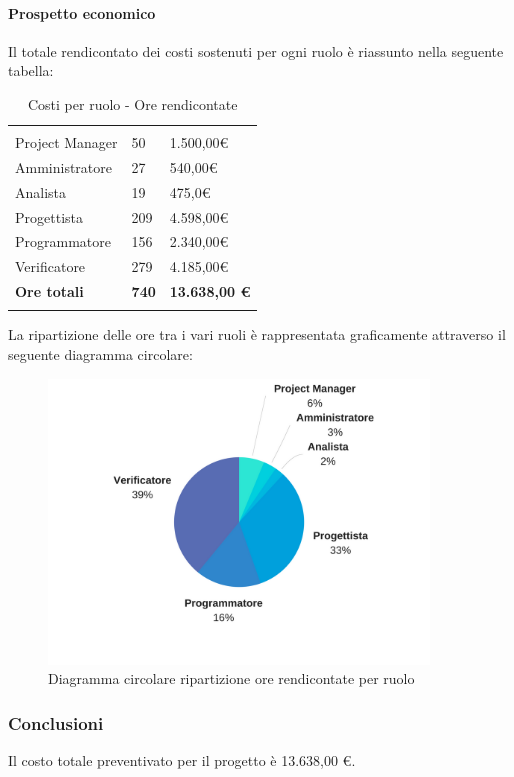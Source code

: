 			
			\paragraph{Prospetto economico} \Spazio
			Il totale rendicontato dei costi sostenuti per ogni ruolo è riassunto nella seguente tabella:
			\begin{table}[H]
				\centering
				\begin{tabular}{|p{4cm}|C{4cm}|C{4cm}|}
					
					 & &\\
					Project Manager & 50 & 1.500,00\euro \\
					\hline
					Amministratore& 27 & 540,00\euro \\
					\hline
					Analista & 19 & 475,0\euro \\
					\hline
					Progettista & 209 & 4.598,00\euro \\
					\hline
					Programmatore & 156 & 2.340,00\euro \\
					\hline
					Verificatore & 279 & 4.185,00\euro \\
					\hline
					\textbf{Ore totali} & \textbf{740} & \textbf{13.638,00 \euro} \\
				\end{tabular}
				\caption{Costi per ruolo - Ore rendicontate}
			\end{table}
		
			La ripartizione delle ore tra i vari ruoli è rappresentata graficamente attraverso il seguente diagramma circolare:
		
			\begin{figure}[H] 
				\centering 
				\includegraphics[width=0.9\textwidth]{images/CircolareSoloRendicontate.png} 
				\caption{Diagramma circolare ripartizione ore rendicontate per ruolo}
				\label{CircolareSoloRendicontate}
			\end{figure}
			
		
			
			\subsubsection{Conclusioni}
			
			Il costo totale preventivato per il progetto è 13.638,00 \euro.
